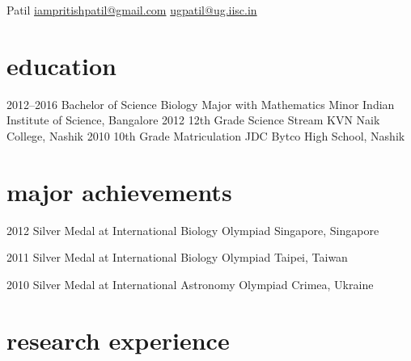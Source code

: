 \documentclass[11pt,print]{friggeri-cv}%
\begin{document}
 {Patil} 
        {\href{mailto:iampritishpatil@gmail.com}{iampritishpatil@gmail.com}\quad  
    \href{mailto:ugpatil@ug.iisc.in}{ugpatil@ug.iisc.in}
}




\section{education}

\begin{entrylist}
  \entryyy
    {2012--2016}
    {Bachelor of Science {\normalfont Biology Major with Mathematics Minor }  }
    {Indian Institute of Science, Bangalore}
  \entryyy
    {2012}
    {12th Grade {\normalfont Science Stream} }
  {KVN Naik College, Nashik}
  \entryyy
    {2010}
    {10th Grade     {\normalfont Matriculation}}
    {JDC Bytco High School, Nashik}
\end{entrylist}


\section{major achievements}
\begin{entrylist}
  \entryyy
    {2012}
    { {\normalfont Silver Medal at }International Biology Olympiad     }
    {Singapore, Singapore}
    
  \entryyy
    {2011}
    {  {\normalfont Silver Medal at }International Biology Olympiad}
    {Taipei, Taiwan}
    
  \entryyy
    {2010}
    { {\normalfont Silver Medal at }International Astronomy Olympiad }
    {Crimea, Ukraine}



\end{entrylist}

\section{research experience}
\end{document}
